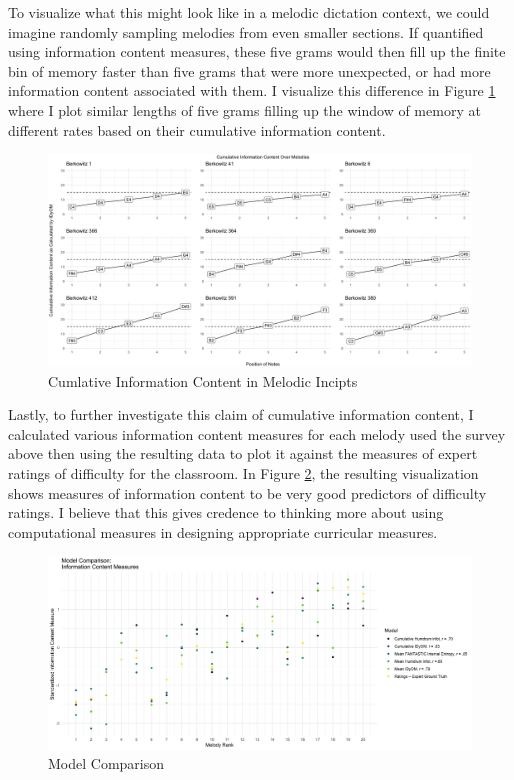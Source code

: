 \documentclass[12pt,]{book}
\begin{document}
To visualize what this might look like in a melodic dictation context, we could imagine randomly sampling melodies from even smaller sections.
If quantified using information content measures, these five grams would then fill up the finite bin of memory faster than five grams that were more unexpected, or had more information content associated with them.
I visualize this difference in Figure \ref{fig:cumplot} where I plot similar lengths of five grams filling up the window of memory at different rates based on their cumulative information content.

\begin{figure}

{\centering \includegraphics[width=1\linewidth]{img/cum_grid_plot} 

}

\caption{Cumlative Information Content in Melodic Incipts}\label{fig:cumplot}
\end{figure}

Lastly, to further investigate this claim of cumulative information content, I calculated various information content measures for each melody used the survey above then using the resulting data to plot it against the measures of expert ratings of difficulty for the classroom.
In Figure \ref{fig:modelcomparison}, the resulting visualization shows measures of information content to be very good predictors of difficulty ratings.
I believe that this gives credence to thinking more about using computational measures in designing appropriate curricular measures.

\begin{figure}

{\centering \includegraphics[width=1\linewidth]{img/model_comparsion_gg} 

}

\caption{Model Comparison}\label{fig:modelcomparison}
\end{figure}
\end{document}
